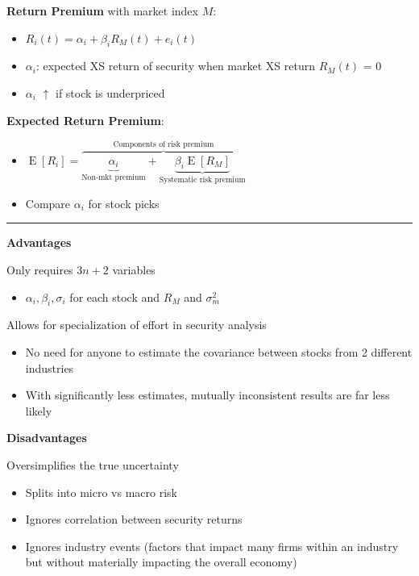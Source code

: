 \documentclass[]{book}
\providecommand{\tightlist}{%
  \setlength{\itemsep}{0pt}\setlength{\parskip}{0pt}}
\theoremstyle{definition}
\theoremstyle{definition}
\theoremstyle{remark}
\begin{document}
\textbf{Return Premium} with market index \(M\):

\begin{itemize}
\item
  \(R_i(t) = \alpha_i + \beta_i R_M(t) + e_i(t)\)
\item
  \(\alpha_i\): expected XS return of security when market XS return
  \(R_M(t)\) = 0
\item
  \(\alpha_i\) \(\uparrow\) if stock is underpriced
\end{itemize}

\textbf{Expected Return Premium}:

\begin{itemize}
\item
  \(\operatorname{E}[R_i] = \overbrace{\underbrace{\alpha_i}_{\text{Non-mkt premium}} + \underbrace{\beta_i \operatorname{E}[R_M]}_{\text{Systematic risk premium}}}^{\text{Components of risk premium}}\)
\item
  Compare \(\alpha_i\) for stock picks
\end{itemize}

\begin{center}\rule{0.5\linewidth}{\linethickness}\end{center}

 \textbf{Advantages}

Only requires \(3n+2\) variables

\begin{itemize}
\tightlist
\item
  \(\alpha_i, \beta_i, \sigma_i\) for each stock and \(R_M\) and
  \(\sigma^2_m\)
\end{itemize}

Allows for specialization of effort in security analysis

\begin{itemize}
\item
  No need for anyone to estimate the covariance between stocks from 2
  different industries
\item
  With significantly less estimates, mutually inconsistent results are
  far less likely
\end{itemize}

\textbf{Disadvantages}

Oversimplifies the true uncertainty

\begin{itemize}
\item
  Splits into micro vs macro risk
\item
  Ignores correlation between security returns
\item
  Ignores industry events (factors that impact many firms within an
  industry but without materially impacting the overall economy)
\end{itemize}
\end{document}
